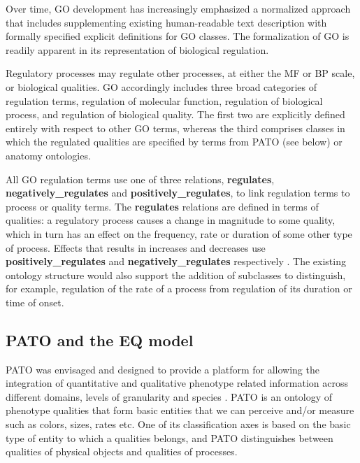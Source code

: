 \documentclass[11pt]{article}
\renewcommand{\cite}{\citep}
\begin{document}
Over time, GO development has increasingly emphasized a normalized
approach that includes supplementing existing human-readable text
description with formally specified explicit definitions for GO
classes. The formalization of GO is readily apparent in its
representation of biological regulation.

Regulatory processes may regulate other processes, at either the MF or
BP scale, or biological qualities. GO accordingly includes three broad
categories of regulation terms, regulation of molecular function,
regulation of biological process, and regulation of biological
quality. The first two are explicitly defined entirely with respect to
other GO terms, whereas the third comprises classes in which the
regulated qualities are specified by terms from PATO (see below) or
anatomy ontologies.

All GO regulation terms use one of three relations, {\bf regulates},
{\bf negatively\_regulates} and {\bf positively\_regulates}, to link
regulation terms to process or quality terms. The {\bf regulates}
relations are defined in terms of qualities: a regulatory process
causes a change in magnitude to some quality, which in turn has an
effect on the frequency, rate or duration of some other type of
process. Effects that results in increases and decreases use {\bf
  positively\_regulates} and {\bf negatively\_regulates} respectively
\cite{Mungall2010go}. The existing ontology structure would also
support the addition of subclasses to distinguish, for example,
regulation of the rate of a process from regulation of its duration or
time of onset.

\subsection{PATO and the EQ model}
PATO was envisaged and designed to provide a platform for allowing the
integration of quantitative and qualitative phenotype related
information across different domains, levels of granularity and
species \cite{Gkoutos2005}.  PATO is an ontology of phenotype
qualities that form basic entities that we can perceive and/or measure
such as colors, sizes, rates etc. One of its classification axes is
based on the basic type of entity to which a qualities belongs, and
PATO distinguishes between qualities of physical objects and qualities
of processes.
\end{document}
